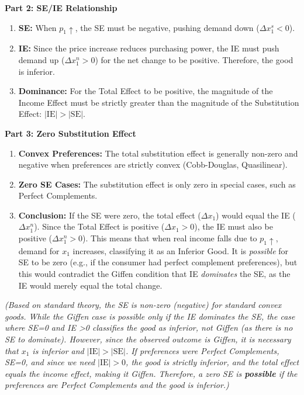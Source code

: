 \documentclass{article}
\begin{document}
\textbf{Part 2: SE/IE Relationship}
\begin{enumerate}
    \item \textbf{SE:} When $p_1 \uparrow$, the SE must be negative, pushing demand down ($\Delta x_1^s < 0$).
    \item \textbf{IE:} Since the price increase reduces purchasing power, the IE must push demand up ($\Delta x_1^n > 0$) for the net change to be positive. Therefore, the good is inferior.
    \item \textbf{Dominance:} For the Total Effect to be positive, the magnitude of the Income Effect must be strictly greater than the magnitude of the Substitution Effect: $|\text{IE}| > |\text{SE}|$.
\end{enumerate}

\textbf{Part 3: Zero Substitution Effect}
\begin{enumerate}
    \item \textbf{Convex Preferences:} The total substitution effect is generally non-zero and negative when preferences are strictly convex (Cobb-Douglas, Quasilinear).
    \item \textbf{Zero SE Cases:} The substitution effect is only zero in special cases, such as Perfect Complements.
    \item \textbf{Conclusion:} If the SE were zero, the total effect ($\Delta x_1$) would equal the IE ($\Delta x_1^n$). Since the Total Effect is positive ($\Delta x_1 > 0$), the IE must also be positive ($\Delta x_1^n > 0$). This means that when real income falls due to $p_1 \uparrow$, demand for $x_1$ increases, classifying it as an Inferior Good. It is \textit{possible} for SE to be zero (e.g., if the consumer had perfect complement preferences), but this would contradict the Giffen condition that IE \textit{dominates} the SE, as the IE would merely equal the total change.
\end{enumerate}

\textit{(Based on standard theory, the SE is non-zero (negative) for standard convex goods. While the Giffen case is possible only if the IE dominates the SE, the case where SE=0 and IE >0 classifies the good as inferior, not Giffen (as there is no SE to dominate). However, since the observed outcome is Giffen, it is necessary that $x_1$ is inferior and $|\text{IE}| > |\text{SE}|$. If preferences were Perfect Complements, SE=0, and since we need $|\text{IE}| > 0$, the good is strictly inferior, and the total effect equals the income effect, making it Giffen. Therefore, a zero SE is \textit{\textbf{possible}} if the preferences are Perfect Complements and the good is inferior.)}
\end{document}
